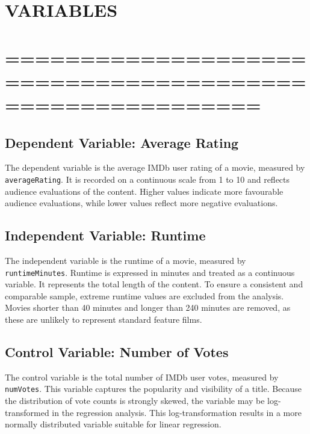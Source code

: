 \documentclass[
]{article}
\begin{document}
\section{VARIABLES}\label{variables}

\section{=========================================================}\label{section-5}

\subsection{Dependent Variable: Average
Rating}\label{dependent-variable-average-rating}

The dependent variable is the average IMDb user rating of a movie,
measured by \texttt{averageRating}. It is recorded on a continuous scale
from 1 to 10 and reflects audience evaluations of the content. Higher
values indicate more favourable audience evaluations, while lower values
reflect more negative evaluations.

\subsection{Independent Variable:
Runtime}\label{independent-variable-runtime}

The independent variable is the runtime of a movie, measured by
\texttt{runtimeMinutes}. Runtime is expressed in minutes and treated as
a continuous variable. It represents the total length of the content. To
ensure a consistent and comparable sample, extreme runtime values are
excluded from the analysis. Movies shorter than 40 minutes and longer
than 240 minutes are removed, as these are unlikely to represent
standard feature films.

\subsection{Control Variable: Number of
Votes}\label{control-variable-number-of-votes}

The control variable is the total number of IMDb user votes, measured by
\texttt{numVotes}. This variable captures the popularity and visibility
of a title. Because the distribution of vote counts is strongly skewed,
the variable may be log-transformed in the regression analysis. This
log-transformation results in a more normally distributed variable
suitable for linear regression.
\end{document}
